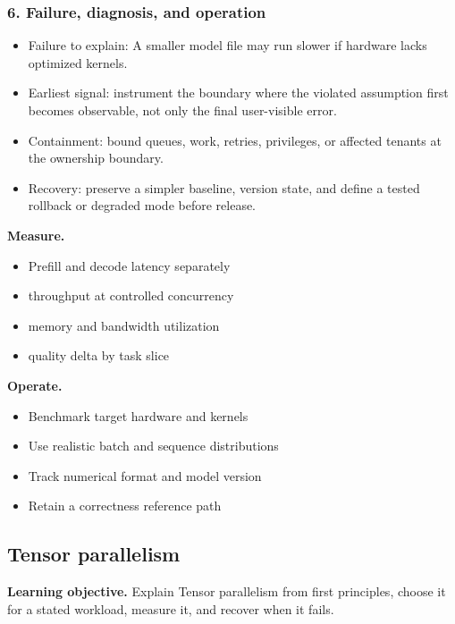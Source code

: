 \subsubsection*{6. Failure, diagnosis, and operation}
\begin{itemize}
\item Failure to explain: A smaller model file may run slower if hardware lacks optimized kernels.
\item Earliest signal: instrument the boundary where the violated assumption first becomes observable, not only the final user-visible error.
\item Containment: bound queues, work, retries, privileges, or affected tenants at the ownership boundary.
\item Recovery: preserve a simpler baseline, version state, and define a tested rollback or degraded mode before release.
\end{itemize}
\textbf{Measure.}\begin{itemize}
\item Prefill and decode latency separately
\item throughput at controlled concurrency
\item memory and bandwidth utilization
\item quality delta by task slice
\end{itemize}
\textbf{Operate.}\begin{itemize}
\item Benchmark target hardware and kernels
\item Use realistic batch and sequence distributions
\item Track numerical format and model version
\item Retain a correctness reference path
\end{itemize}
\subsection{Tensor parallelism}
\textbf{Learning objective.} Explain Tensor parallelism from first principles, choose it for a stated workload, measure it, and recover when it fails.
